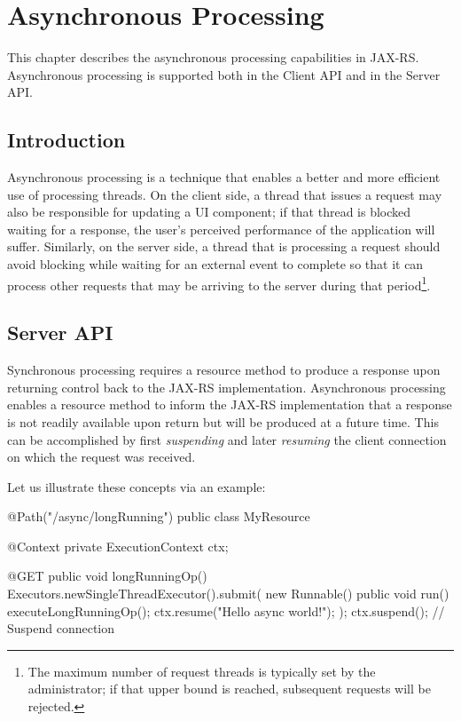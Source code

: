 \chapter{Asynchronous Processing}
\label{asynchronous_processing}

This chapter describes the asynchronous processing capabilities in JAX-RS. Asynchronous processing is supported both in the Client API and in the Server API.

\section{Introduction}
\label{introduction}

Asynchronous processing is a technique that enables a better and more efficient use of processing threads. On the client side, a thread that issues a request may also be responsible for updating a UI component; if that thread is blocked waiting for a response, the user's perceived performance of the application will suffer. Similarly, on the server side, a thread that is processing a request should avoid blocking while waiting for an external event to complete so that it can process other requests that may be arriving to the server during that period\footnote{The maximum number of request threads is typically set by the administrator; if that upper bound is reached, subsequent requests will be rejected.}.

\section{Server API}
\label{server_api}

Synchronous processing requires a resource method to produce a response upon returning control back to the JAX-RS implementation. Asynchronous processing enables a resource method to inform the JAX-RS implementation that a response is not readily available upon return but will be produced at a future time. This can be accomplished by first {\em suspending} and later {\em resuming} the client connection on which the request was received. 

Let us illustrate these concepts via an example:

\begin{listing}{1}
@Path("/async/longRunning")
public class MyResource {
    @Context
    private ExecutionContext ctx;
    
    @GET
    public void longRunningOp() {
        Executors.newSingleThreadExecutor().submit(
            new Runnable() {
                public void run() {
                    executeLongRunningOp();
                    ctx.resume("Hello async world!");
        } });
        ctx.suspend();    // Suspend connection
    } 
}
\end{listing}

